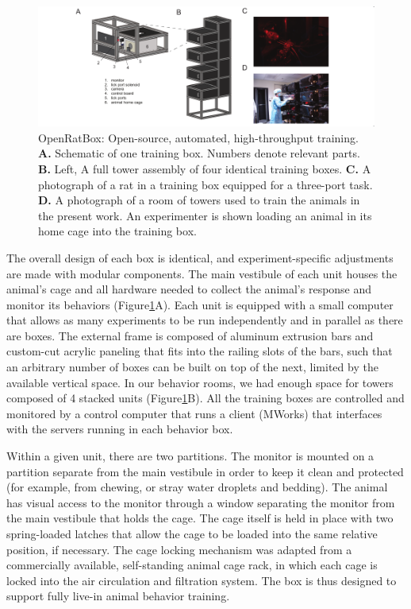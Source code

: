 \begin{figure}[t!]
    \includegraphics[width=\textwidth]{figures/chapter_1/fig_1-1_openratbox/fig_1-1_openratbox_compressed.pdf}
    \vspace{.1in}
    \caption[OpenRatBox]{OpenRatBox: Open-source, automated, high-throughput training. \textbf{A.} Schematic of one training box. Numbers denote relevant parts. 
    \textbf{B.} Left, A full tower assembly of four identical training boxes. \textbf{C.} A photograph of a rat in a training box equipped for a three-port task. \textbf{D.} A photograph of a room of towers used to train the animals in the present work. An experimenter is shown loading an animal in its home cage into the training box.  
    \label{fig:openratbox}}
\end{figure}

The overall design of each box is identical, and experiment-specific adjustments are made with modular components. The main vestibule of each unit houses the animal's cage and all hardware needed to collect the animal's response and monitor its behaviors (Figure\ref{fig:openratbox}A). Each unit is equipped with a small computer that allows as many experiments to be run independently and in parallel as there are boxes. The external frame is composed of aluminum extrusion bars and custom-cut acrylic paneling that fits into the railing slots of the bars, such that an arbitrary number of boxes can be built on top of the next, limited by the available vertical space. In our behavior rooms, we had enough space for towers composed of 4 stacked units (Figure\ref{fig:openratbox}B). All the training boxes are controlled and monitored by a control computer that runs a client (MWorks) that interfaces with the servers running in each behavior box. 

Within a given unit, there are two partitions. The monitor is mounted on a partition separate from the main vestibule in order to keep it clean and protected (for example, from chewing, or stray water droplets and bedding). The animal has visual access to the monitor through a window separating the monitor from the main vestibule that holds the cage. The cage itself is held in place with two spring-loaded latches that allow the cage to be loaded into the same relative position, if necessary. The cage locking mechanism was adapted from a commercially available, self-standing animal cage rack, in which each cage is locked into the air circulation and filtration system. The box is thus designed to support fully live-in animal behavior training. 

